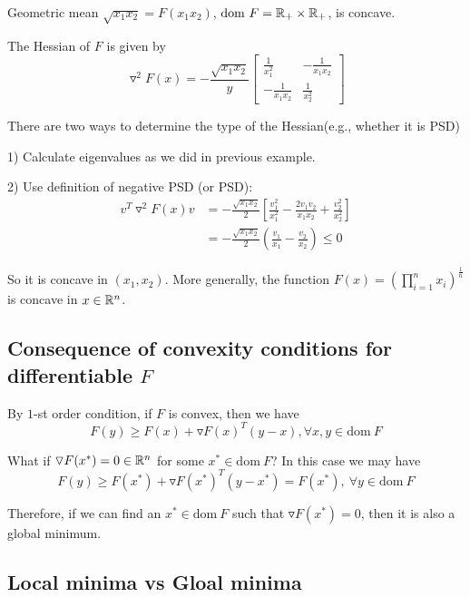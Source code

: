 \begin{example}
	Geometric mean $\sqrt{x_1x_2} = F(x_1x_2)$, $\text{dom}\ F = \mathbb{R}_+ \times \mathbb{R}_+$, is concave. 
	
	The Hessian of $F$ is given by
	\begin{equation*}
	\triangledown^2F(x) = -\frac{\sqrt{x_1x_2}}{y}\begin{bmatrix}
	\frac{1}{x^2_1} & -\frac{1}{x_1x_2}\\
	-\frac{1}{x_1x_2} & \frac{1}{x^2_2}
	\end{bmatrix}
	\end{equation*}
	
	There are two ways to determine the type of the Hessian(e.g., whether it is PSD)
	
	1) Calculate eigenvalues as we did in previous example.
	
	2) Use definition of negative PSD (or PSD):
	\begin{align*}
	v^T\triangledown^2F(x)v &= -\frac{\sqrt{x_1x_2}}{2}[\frac{v_1^2}{x_1^2} - \frac{2v_1v_2}{x_1x_2} + \frac{v_2^2}{x^2_2}]\\
	&= -\frac{\sqrt{x_1x_2}}{2}(\frac{v_1}{x_1} -\frac{v_2}{x_2}) \leq 0
	\end{align*}
	
	So it is concave in $(x_1, x_2)$. More generally, the function $F(x) = (\prod^n_{i=1}x_i)^{\frac{1}{n}}$ is concave in $x\in \mathbb{R}^n$.
\end{example}

\subsection{Consequence of convexity conditions for differentiable $F$}

\quad By $1$-st order condition, if $F$ is convex, then we have
$$F(y)\geq F(x) + \triangledown F(x)^T(y-x), \forall x,y\in \text{dom}\ F$$

What if $\triangledown F(x^*) = 0 \in \mathbb{R}^n$ for some $x^*\in \text{dom}\ F$? In this case we may have
$$F(y)\geq F(x^*) + \triangledown F(x^*)^T(y-x^*)=F(x^*),\ \forall y\in \text{dom}\ F$$

Therefore, if we can find an $x^*\in \text{dom}\ F$ such that $\triangledown F(x^*) = 0$, then it is also a global minimum.





\subsection{Local minima vs Gloal minima}

